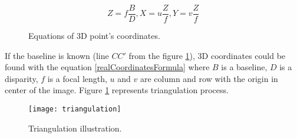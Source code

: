 \documentclass[../../../../main]{subfiles}
\begin{document}
\begin{figure} [ht!]
  \centering  
      \begin{equation}
         Z = f\frac{B}{D}, X = u\frac{Z}{f}, Y = v\frac{Z}{f}
         \label{realCoordinatesFormula}
      \end{equation}
  \caption{Equations of 3D point's coordinates.}
\end{figure}

If the baseline is known (line $CC'$ from the figure \ref{fig:triangulation}), 3D coordinates could be found with the equation \ref{realCoordinatesFormula} where $B$ is a baseline, $D$ is a disparity, $f$ is a focal length, $u$ and $v$ are column and row with the origin in center of the image. Figure \ref{fig:triangulation} represents triangulation process.

\begin{figure} [ht]
    \begin{center}
        \texttt{[image: triangulation]}
        \caption{Triangulation illustration.}
        \label{fig:triangulation}
    \end{center}
\end{figure}
\end{document}

